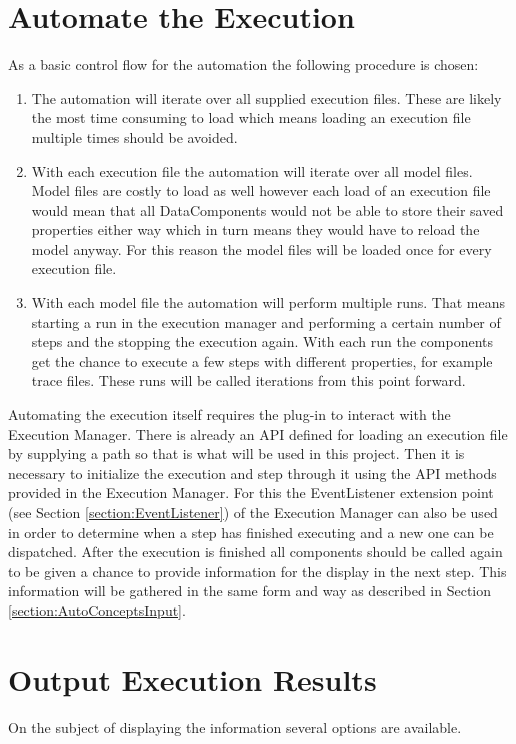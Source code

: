 \section{Automate the Execution}
\label{section:AutoConceptsExecution}
As a basic control flow for the automation the following procedure is chosen:
\begin{enumerate}
 \item The automation will iterate over all supplied execution files. These are likely the most time consuming
to load which means loading an execution file multiple times should be avoided.
 \item With each execution file the automation will iterate over all model files. Model files are costly to load
as well however each load of an execution file would mean that all DataComponents would not be able to store their
saved properties either way which in turn means they would have to reload the model anyway. For this reason the model
files will be loaded once for every execution file.
 \item With each model file the automation will perform multiple runs. That means starting a run in the execution manager
and performing a certain number of steps and the stopping the execution again. With each run the components get the chance
to execute a few steps with different properties, for example trace files. These runs will be called iterations from this
point forward.
\end{enumerate}

Automating the execution itself requires the plug-in to interact with the Execution Manager.
There is already an \ac{API} defined for loading an execution file by supplying a path so that
is what will be used in this project.
Then it is necessary to initialize the execution and step through it using the \ac{API}
methods provided in the Execution Manager. For this the EventListener extension point (see Section \ref{section:EventListener}) of the 
Execution Manager can also be used in order to determine when a step has finished executing and
a new one can be dispatched.
After the execution is finished all components should be called again to be given
a chance to provide information for the display in the next step. This information
will be gathered in the same form and way as described in Section \ref{section:AutoConceptsInput}.


\section{Output Execution Results}
\label{section:AutoConceptsOutput}
On the subject of displaying the information several options are available.

